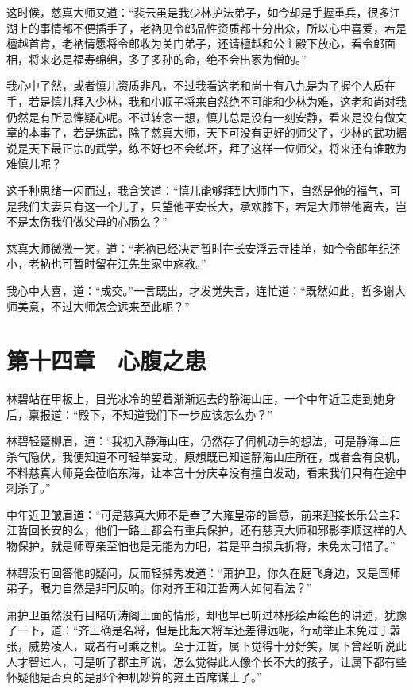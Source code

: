 这时候，慈真大师又道：“裴云虽是我少林护法弟子，如今却是手握重兵，很多江湖上的事情都不便插手了，老衲见令郎品性资质都十分出众，所以心中喜爱，若是檀越首肯，老衲情愿将令郎收为关门弟子，还请檀越和公主殿下放心，看令郎面相，将来必是福寿绵绵，多子多孙的命，绝不会出家为僧的。”

我心中了然，或者慎儿资质非凡，不过我看这老和尚十有八九是为了握个人质在手，若是慎儿拜入少林，我和小顺子将来自然绝不可能和少林为难，这老和尚对我仍然是有所忌惮疑心呢。不过转念一想，慎儿总是没有一刻安静，看来是没有做文章的本事了，若是练武，除了慈真大师，天下可没有更好的师父了，少林的武功据说是天下最正宗的武学，练不好也不会练坏，拜了这样一位师父，将来还有谁敢为难慎儿呢？

这千种思绪一闪而过，我含笑道：“慎儿能够拜到大师门下，自然是他的福气，可是我们夫妻只有这一个儿子，只望他平安长大，承欢膝下，若是大师带他离去，岂不是太伤我们做父母的心肠么？”

慈真大师微微一笑，道：“老衲已经决定暂时在长安浮云寺挂单，如今令郎年纪还小，老衲也可暂时留在江先生家中施教。”

我心中大喜，道：“成交。”一言既出，才发觉失言，连忙道：“既然如此，哲多谢大师美意，不过大师怎会远来至此呢？”

\chapter{第十四章　心腹之患}

林碧站在甲板上，目光冰冷的望着渐渐远去的静海山庄，一个中年近卫走到她身后，禀报道：“殿下，不知道我们下一步应该怎么办？”

林碧轻蹙柳眉，道：“我初入静海山庄，仍然存了伺机动手的想法，可是静海山庄杀气隐伏，我便知道不可轻举妄动，原想既已知道静海山庄所在，或者会有良机，不料慈真大师竟会莅临东海，让本宫十分庆幸没有擅自发动，看来我们只有在途中刺杀了。”

中年近卫皱眉道：“可是慈真大师不是奉了大雍皇帝的旨意，前来迎接长乐公主和江哲回长安的么，他们一路上都会有重兵保护，还有慈真大师和邪影李顺这样的人物保护，就是师尊亲至怕也是无能为力吧，若是平白损兵折将，未免太可惜了。”

林碧没有回答他的疑问，反而轻拂秀发道：“萧护卫，你久在庭飞身边，又是国师弟子，眼力自然是非同反响。你对齐王和江哲两人如何看法？”

萧护卫虽然没有目睹听涛阁上面的情形，却也早已听过林彤绘声绘色的讲述，犹豫了一下，道：“齐王确是名将，但是比起大将军还差得远呢，行动举止未免过于嚣张，威势凌人，或者有可乘之机。至于江哲，属下觉得十分好笑，属下曾经听说此人才智过人，可是听了郡主所说，怎么觉得此人像个长不大的孩子，让属下都有些怀疑他是否真的是那个神机妙算的雍王首席谋士了。”


